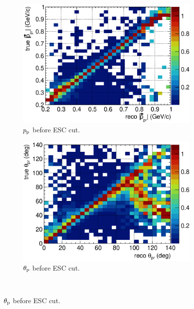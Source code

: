      \begin{figure}
        \centering
        \begin{subfigure}[b]{\dbfigwid\textwidth}
             \centering
             \includegraphics[width=\textwidth]{figures/sel/p_pr_colnor_resmat_al13.eps}
             \caption{$p_\textrm{p}$ before ESC cut.}
             \label{subfig:esc-ppr-bfesc}
        \end{subfigure}
        \begin{subfigure}[b]{\dbfigwid\textwidth}
             \centering
             \includegraphics[width=\textwidth]{figures/sel/theta_pr_colnor_resmat_al13.eps}
             \caption{$\theta_\textrm{p}$ before ESC cut.}
             \label{subfig:esc-tpr-bfesc}
        \end{subfigure}
        \\

\end{figure}
